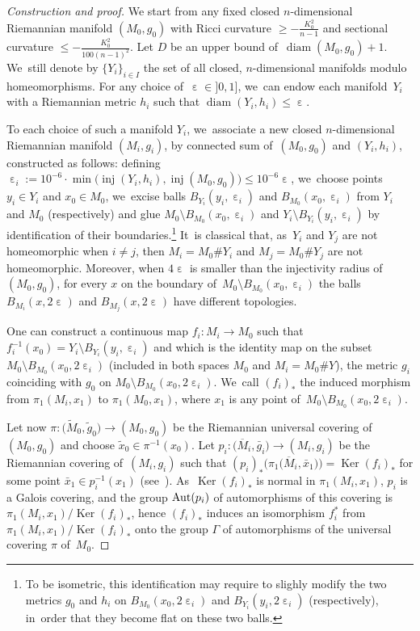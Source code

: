 \documentclass[10pt,a4paper]{amsart}
\numberwithin{equation}{section}
\newcommand{\f}{\rightarrow}
\newcommand{\Ker}{\operatorname{Ker}}
\newcommand{\diam}{\operatorname{diam}}
\newcommand{\inj}{\operatorname{inj}}
\newcommand{\e}{\operatorname{\varepsilon}}
\begin{document}
\begin{proof}[Construction and proof]
We start from any fixed closed $n$-dimensional Riemannian manifold $(M_0,
g_0)$ with Ricci curvature $\ge - \frac{K_0^2}{n-1}$ and
sectional curvature $\le - \frac{K_0^2}{100 (n-1)^2}$. Let $D$ be an upper bound of~$\diam (M_0, g_0) + 1$. We~still denote by $\{Y_i\}_{i \in I}$ the set of all closed, $n$-dimensional manifolds modulo homeomorphisms. For any choice of~$\e \in{} ]0, 1]$, we~can endow
each mani\-fold~$Y_i$ with a Riemannian metric $h_i$ such that $\diam (Y_i,
h_i) \le \e$.

To each choice of such a manifold $Y_i$, we~associate a new closed $n$-dimensional Riemannian manifold $(M_i, g_i)$, by connected sum of~$(M_0, g_0)$
and $(Y_i,h_i)$, constructed as follows: defining $\e_i := 10^{- 6}\cdot \min \big( \inj (Y_i, h_i), \inj (M_0, g_0)\big) \le 10^{- 6} \e$, we~choose points $y_i \in Y_i$ and
$x_0 \in M_0$, we~excise balls $B_{Y_i} (y_i, \e_i)$ and $B_{M_0} (x_0, \e_i)$ from $Y_i$ and $M_0$ (respectively) and glue $M_0 \setminus B_{M_0} (x_0, \e_i)$ and $Y_i \setminus B_{Y_i} (y_i, \e_i)$ by identification of their boundaries.\footnote{To be isometric, this identification may
require to slighly modify the two metrics $g_0$ and $h_i$ on $B_{M_0} (x_0, 2 \e_i)$ and $B_{Y_i} (y_i, 2 \e_i)$ (respectively), in~order that they become flat
on these two balls.} It~is classical that, as~$Y_i$ and $Y_j$ are not homeomorphic when $i\ne j$, then $M_i = M_0 \# Y_i$ and $M_j = M_0 \# Y_j$ are not homeomorphic. Moreover, when $4\e$ is smaller than the injectivity radius of~$(M_0, g_0)$, for every $x$ on the boundary of~$M_0 \setminus B_{M_0} (x_0, \e_i)$ the balls $B_{M_i} (x, 2 \e)$ and $B_{M_j} (x, 2 \e)$ have different topologies.

One can construct a continuous map $f_i \colon M_i \f M_0$ such that $f_i^{-1} (x_0) = Y_i \setminus B_{Y_i} (y_i, \e_i) $ and which is the identity map on the subset
$M_0 \setminus B_{M_0} (x_0, 2 \e_i)$ (included in both spaces $M_0$ and $M_i = M_0 \# Y$), the metric $g_i$ coinciding with $g_0$ on
$M_0 \setminus B_{M_0} (x_0, 2 \e_i)$. We~call $(f_i)_* $ the induced morphism from $\pi_1 (M_i, x_1)$ to $\pi_1 (M_0, x_1)$, where
$x_1$ is any point of~$M_0 \setminus B_{M_0} (x_0, 2 \e_i)$.

Let now $\pi \colon \big(\widetilde M_0, \tilde g_0\big) \f (M_0, g_0)$ be the Riemannian universal covering of~$(M_0, g_0)$ and choose $\tilde x_0 \in \pi^{-1} (x_0)$. Let
$ p_i \colon \big(\overline M_i, \bar g_i\big) \f (M_i, g_i)$ be the Riemannian covering of~$(M_i, g_i)$ such that $(p_i)_* \big(\pi_1 \big(\overline M_i, \bar x_1\big) \big) = \Ker (f_i)_* $ for some point $\bar x_1 \in p_i^{-1} (x_1)$ (see~\cite[Corollary~(6.9)]{GrH}). As~$\Ker (f_i)_*$ is normal in $\pi_1 (M_i, x_1)$, $p_i$ is a Galois covering, and
the group ${\rm Aut} (p_i)$ of automorphisms of this cove\-ring is $\pi_1 (M_i, x_1) / \Ker (f_i)_* $, hence $(f_i)_* $ induces an isomorphism $f_i^*$ from $\pi_1 (M_i, x_1) / \Ker (f_i)_* $ onto the group $\Gamma$ of
automorphisms of the universal covering $\pi$ of~$M_0$.


\end{proof}
\end{document}
